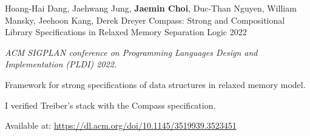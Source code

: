 \begin{cventries}
  \cventryPub
    {Hoang-Hai Dang, Jaehwang Jung, \textbf{Jaemin Choi}, Duc-Than Nguyen, William Mansky, Jeehoon Kang, Derek Dreyer} %
    {Compass: Strong and Compositional Library Specifications in Relaxed Memory Separation Logic} %
    {2022} %
    {
      \textit{ACM SIGPLAN conference on Programming Languages Design and Implementation (PLDI) 2022.}
      \begin{cvitems}
        \item[]
        \item Framework for strong specifications of data structures in relaxed memory model.
        \item I verified Treiber's stack with the Compass specification.
        \item Available at: \href{https://dl.acm.org/doi/10.1145/3519939.3523451}{https://dl.acm.org/doi/10.1145/3519939.3523451}
      \end{cvitems}
    }


\end{cventries}
